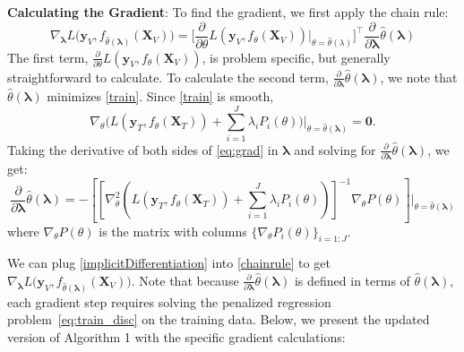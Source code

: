 \documentclass[10pt,letterpaper]{article}
\newcommand*{\vertbar}{\rule[-1ex]{0.5pt}{2.5ex}}
\begin{document}
\noindent
\textbf{Calculating the Gradient}:
To find the gradient, we first apply the chain rule:
\begin{equation}
\nabla_{\boldsymbol{\lambda}} L \Big( \boldsymbol{y}_V, f_{\hat{\theta}(\boldsymbol{\lambda})}(\boldsymbol{X}_V) \Big ) = 
\Big [\frac{\partial}{\partial \theta} L ( \boldsymbol{y}_V, f_{\theta}(\boldsymbol{X}_V)) \Big |_{\theta=\hat{\theta}(\lambda)} \Big ]^\top 
\frac{\partial}{\partial \boldsymbol{\lambda}} \hat{\theta}(\boldsymbol{\lambda})
\label{chainrule}
\end{equation}
The first term, $\frac{\partial}{\partial \theta} L ( \boldsymbol{y}_V, f_{\theta}(\boldsymbol{X}_V))$, is problem specific, but generally straightforward to calculate. To calculate the second term, $\frac{\partial}{\partial \boldsymbol{\lambda}} \hat{\theta}(\boldsymbol{\lambda})$, we note that $\hat{\theta}(\boldsymbol{\lambda})$ minimizes \eqref{train}. Since \eqref{train} is smooth,
\begin{equation}
\nabla_\theta \Big ( L(\boldsymbol{y}_T, f_\theta (\boldsymbol{X}_T)) + \sum\limits_{i=1}^J \lambda_i P_i(\theta) \Big ) \Big |_{\theta = \hat \theta(\boldsymbol{\lambda})} = \boldsymbol{0}.
\label{eq:grad}
\end{equation}
Taking the derivative of both sides of \eqref{eq:grad} in $\boldsymbol{\lambda}$ and solving for $\frac{\partial}{\partial \boldsymbol{\lambda}} \hat{\theta}(\boldsymbol{\lambda})$, we get:
\begin{equation}
\frac{\partial}{\partial \boldsymbol{\lambda}} \hat{\theta}(\boldsymbol{\lambda}) = 
- \left [ \left [
 \nabla_\theta^2 \left (  L(\boldsymbol{y}_T, f_\theta (\boldsymbol{X}_T))  +  \sum\limits_{i=1}^J \lambda_i P_i(\theta)  \right )  \right ]^{-1}
\nabla_\theta P(\theta)
\right ]
\bigg |_{\theta = \hat \theta(\boldsymbol{\lambda})}
\label{implicitDifferentiation}
\end{equation}
where $\nabla_\theta P(\theta)$ is the matrix with columns $\{\nabla_\theta P_i(\theta)\}_{i=1:J}$.

We can plug \eqref{implicitDifferentiation} into \eqref{chainrule} to get $\nabla_{\boldsymbol{\lambda}} L \Big( \boldsymbol{y}_V, f_{\hat{\theta}(\boldsymbol{\lambda})}(\boldsymbol{X}_V) \Big )$. Note that because $\frac{\partial}{\partial \boldsymbol{\lambda}} \hat{\theta}(\boldsymbol{\lambda})$ is defined in terms of $\hat{\theta}\left(\boldsymbol{\lambda}\right)$, each gradient step requires solving the penalized regression problem~\eqref{eq:train_disc} on the training data. Below, we present the updated version of Algorithm 1 with the specific gradient calculations:
\end{document}

